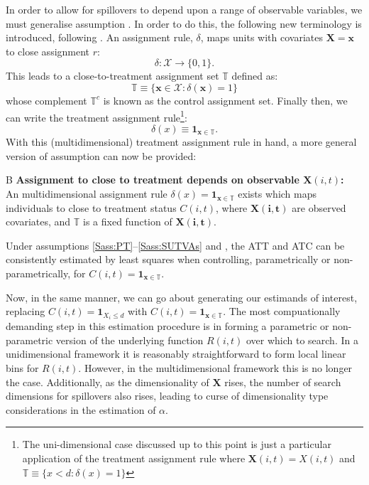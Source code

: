 In order to allow for spillovers to depend upon a range of observable variables,
we must generalise assumption .  In order to do this, the
following new terminology is introduced, following \citet{Zajonc2012}. An 
assignment rule, $\delta$, maps units with covariates $\mathbf{X=x}$ to close
assignment $r$:
\[
\delta: \mathcal{X} \rightarrow \{0,1\}.
\]
This leads to a close-to-treatment assignment set $\mathbb{T}$ defined as:
\[
\mathbb{T}\equiv \{ \mathbf{x}\in\mathcal{X}: \delta(\mathbf{x})=1 \}
\]
whose complement $\mathbb{T}^c$ is known as the control assignment
set. Finally then, we can write the treatment assignment rule\footnote{The
uni-dimensional case discussed up to this point is just a particular application
of the treatment assignment rule where $\mathbf{X}(i,t)=X(i,t)$ and 
$\mathbb{T}\equiv \{ x<d: \delta(x)=1 \}$}:
\begin{equation}
\delta(x)\equiv \mathbf{1}_{\mathbf{x}\in\mathbb{T}}.
\end{equation}
With this (multidimensional) treatment assignment rule in hand, a more general 
version of assumption  can now be provided:

\begin{assumption}{4}{B}
\label{Sass:SUTVAlM}
\textbf{Assignment to close to treatment depends on observable $\mathbf{X}(i,t)$:} \\ 
An multidimensional assignment rule $\delta(x)=\mathbf{1}_{\mathbf{x}\in \mathbb{T}}$ 
exists which maps individuals to close to treatment status $C(i,t)$, where 
$\mathbf{X(i,t)}$ are observed covariates, and $\mathbb{T}$ is a fixed 
function of $\mathbf{X(i,t)}$.
\end{assumption}

\begin{proposition}
\label{Pass:ATTnonP}
Under assumptions \ref{Sass:PT}--\ref{Sass:SUTVAs} and , 
the ATT and ATC can be consistently estimated by least squares when controlling, 
parametrically or non-parametrically, for $C(i,t)=\mathbf{1}_{\mathbf{x}\in
\mathbb{T}}$. 
\end{proposition}

Now, in the same manner, we can go about generating our estimands of interest, 
replacing $C(i,t)=\mathbf{1}_{X_i\leq d}$ with $C(i,t)=\mathbf{1}_{\mathbf{x}\in 
\mathbb{T}}$. The most compuationally demanding step in this estimation procedure 
is in forming a parametric or non-parametric version of the underlying function 
$R(i,t)$ over which to search.  In a unidimensional framework it is reasonably 
straightforward to form local linear bins for $R(i,t)$.  However, in the 
multidimensional framework this is no longer the case.  Additionally, as the 
dimensionality of $\mathbf{X}$ rises, the number of search dimensions for 
spillovers also rises, leading to curse of dimensionality type considerations in 
the estimation of $\alpha$.

